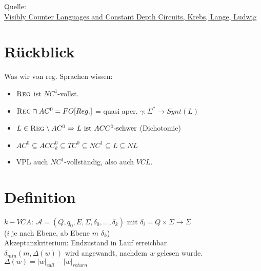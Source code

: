 Quelle:\\ \href{http://drops.dagstuhl.de/opus/volltexte/2015/4944/pdf/44.pdf}{Visibly Counter Languages and Constant Depth Circuits, Krebs, Lange, Ludwig}
\section{Rückblick}
    Was wir von reg. Sprachen wissen:
    \begin{itemize}
        \item $\textsc{Reg}$ ist $NC^1$-vollst.
        \item $\textsc{Reg}\cap AC^0 = FO[Reg.]$
        	= quasi aper. $\gamma:\Sigma^*\to Synt(L)$
        \item $L\in \textsc{Reg}\setminus AC^0 \Rightarrow L \text{ ist } ACC^0 \text{-schwer}$ (Dichotomie)
        \item $AC^0 \subsetneq ACC_k^0 \subseteq TC^0 \subseteq NC^1 \subseteq L \subseteq NL$\\[1mm]
        \item VPL auch $NC^1$-vollständig, also auch $VCL$.
    \end{itemize}
\section{Definition}
    $k-VCA:\ \mathcal{A} = (Q, q_0, E, \Sigma, \delta_0, \dots, \delta_k)$ mit $\delta_i = Q \times \Sigma \to \Sigma$ \\($i$ je nach Ebene, ab Ebene $m$ $\delta_k$)\\[2mm]
    Akzeptanzkriterium: Endzustand in Lauf erreichbar\\
    $\delta_{min}(m, \Delta(w))$ wird angewandt, nachdem $w$ gelesen wurde. $\Delta(w) = |w|_{call} - |w|_{return}$\\
